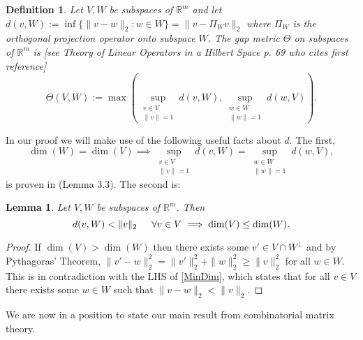 \documentclass[journal, onecolumn]{IEEEtran}
\newtheorem{lemma}{Lemma}
\newtheorem{definition}{Definition}
\begin{document}
\begin{definition}
Let $V, W$ be subspaces of $\mathbb{R}^m$ and let $d(v,W) := \inf\{\|v-w\|_2: w \in W\} = \|v - \Pi_W v\|_2$ where $\Pi_W$ is the orthogonal projection operator onto subspace $W$. The \emph{gap} metric $\Theta$ on subspaces of $\mathbb{R}^{m}$ is [see Theory of Linear Operators in a Hilbert Space p. 69 who cites first reference]
\begin{equation}\label{SubspaceMetric}
\Theta(V,W) := \max\left( \sup_{\substack{v \in V \\ \|v\| = 1}} d(v,W), \sup_{\substack{w \in W \\ \|w\| = 1}} d(w,V) \right).
\end{equation}
\end{definition}
%
In our proof we will make use of the following useful facts about $d$. The first, 
\begin{equation}\label{SubspaceMetricSameDim}
\dim(W) = \dim(V) \implies \sup_{\substack{v \in V \\ \|v\| = 1}}  d(v,W)  = \sup_{\substack{w \in W \\ \|w\| = 1}} d(w,V),
\end{equation}
%
is proven in \cite{Morris10} (Lemma 3.3). The second is:
\begin{lemma}\label{MinDimLemma}
Let $V, W$ be subspaces of $\mathbb{R}^{m}$. Then
\begin{equation}\label{MinDim}
d(v,W) < \|v\|_2 \indent \forall v \in V \implies \dim(V) \leq \dim(W).
\end{equation}
\end{lemma}

\begin{proof}
If $\dim(V) > \dim(W)$ then there exists some $v' \in V \cap W^\perp$ and by Pythagoras' Theorem, $\|v' - w\|_2^2 = \|v'\|_2^2 + \|w\|_2^2 \geq \|v\|_2^2$ for all $w \in W$. This is in contradiction with the LHS of \eqref{MinDim}, which states that for all $v \in V$ there exists some $w \in W$ such that $\|v - w\|_2 < \|v\|_2$.
\end{proof}

We are now in a position to state our main result from combinatorial matrix theory.

\end{document}
